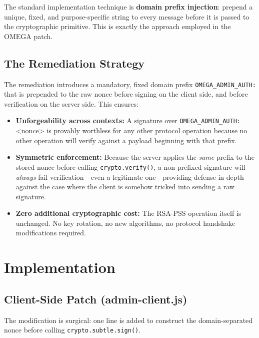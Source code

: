 \documentclass[12pt,a4paper]{article}
\begin{document}
The standard implementation technique is \textbf{domain prefix injection}: prepend a unique, fixed, and purpose-specific string to every message before it is passed to the cryptographic primitive. This is exactly the approach employed in the OMEGA patch.

\subsection{The Remediation Strategy}

The remediation introduces a mandatory, fixed domain prefix \texttt{OMEGA\_ADMIN_AUTH:} that is prepended to the raw nonce before signing on the client side, and before verification on the server side. This ensures:

\begin{itemize}
    \item \textbf{Unforgeability across contexts:} A signature over \texttt{OMEGA\_ADMIN\_AUTH:}<nonce> is provably worthless for any other protocol operation because no other operation will verify against a payload beginning with that prefix.
    \item \textbf{Symmetric enforcement:} Because the server applies the \textit{same} prefix to the stored nonce before calling \texttt{crypto.verify()}, a non-prefixed signature will \textit{always} fail verification---even a legitimate one---providing defense-in-depth against the case where the client is somehow tricked into sending a raw signature.
    \item \textbf{Zero additional cryptographic cost:} The RSA-PSS operation itself is unchanged. No key rotation, no new algorithms, no protocol handshake modifications required.
\end{itemize}

\section{Implementation}

\subsection{Client-Side Patch (admin-client.js)}

The modification is surgical: one line is added to construct the domain-separated nonce before calling \texttt{crypto.subtle.sign()}.
\end{document}
